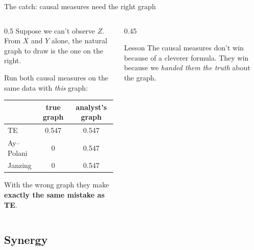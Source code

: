 \documentclass[aspectratio=169,11pt,xcolor={table}]{beamer}
\newcommand{\flagged}[1]{\cellcolor{flag}#1}
\begin{document}
\begin{frame}{The catch: causal measures need the right graph}
  \begin{columns}[c]
    \begin{column}{0.5\textwidth}
      Suppose we can't observe $Z$. From $X$ and $Y$ alone, the natural graph to draw is the one on the right.
      \medskip

      Run both causal measures on the same data with \emph{this} graph:
      \begin{center}
        \begin{tabular}{lcc}
          \toprule & true graph & analyst's graph \\ \midrule
          TE & 0.547 & 0.547 \\
          Ay--Polani & 0 & \flagged{0.547} \\
          Janzing & 0 & \flagged{0.547} \\ \bottomrule
        \end{tabular}
      \end{center}
      \medskip
      With the wrong graph they make \textbf{exactly the same mistake as TE}.
    \end{column}
    \begin{column}{0.45\textwidth}
      \centering
      \bigskip
      \begin{block}{Lesson}
        \small The causal measures don't win because of a cleverer formula.
        They win because we \emph{handed them the truth} about the graph.
      \end{block}
    \end{column}
  \end{columns}
\end{frame}

\subsection{Synergy}
\end{document}
